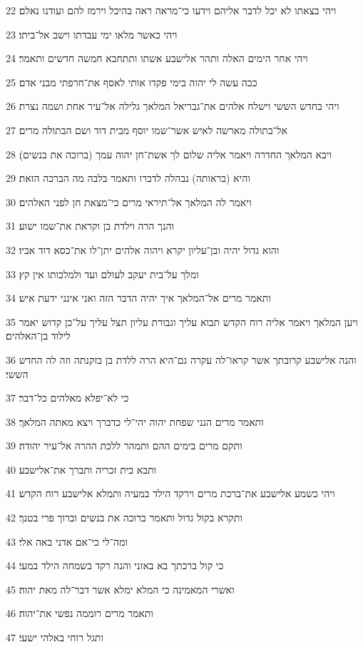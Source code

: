 \par 22 ויהי בצאתו לא יכל לדבר אליהם וידעו כי־מראה ראה בהיכל וירמז להם ועודנו נאלם׃
\par 23 ויהי כאשר מלאו ימי עבדתו וישב אל־ביתו׃
\par 24 ויהי אחר הימים האלה ותהר אלישבע אשתו ותתחבא חמשה חדשים ותאמר׃
\par 25 ככה עשה לי יהוה בימי פקדו אותי לאסף את־חרפתי מבני אדם׃
\par 26 ויהי בחדש הששי וישלח אלהים את־גבריאל המלאך גלילה אל־עיר אחת ושמה נצרת׃
\par 27 אל־בתולה מארשה לאיש אשר־שמו יוסף מבית דוד ושם הבתולה מרים׃
\par 28 ויבא המלאך החדרה ויאמר אליה שלום לך אשת־חן יהוה עמך (ברוכה את בנשים)׃
\par 29 והיא (בראותה) נבהלה לדברו ותאמר בלבה מה הברכה הזאת׃
\par 30 ויאמר לה המלאך אל־תיראי מרים כי־מצאת חן לפני האלהים׃
\par 31 והנך הרה וילדת בן וקראת את־שמו ישוע׃
\par 32 והוא גדול יהיה ובן־עליון יקרא ויהוה אלהים יתן־לו את־כסא דוד אביו׃
\par 33 ומלך על־בית יעקב לעולם ועד ולמלכותו אין קץ׃
\par 34 ותאמר מרים אל־המלאך איך יהיה הדבר הזה ואני אינני ידעת איש׃
\par 35 ויען המלאך ויאמר אליה רוח הקדש תבוא עליך וגבורת עליון תצל עליך על־כן קדוש יאמר לילוד בן־האלהים׃
\par 36 והנה אלישבע קרובתך אשר קראו־לה עקרה גם־היא הרה ללדת בן בזקנתה וזה לה החדש הששי׃
\par 37 כי לא־יפלא מאלהים כל־דבר׃
\par 38 ותאמר מרים הנני שפחת יהוה יהי־לי כדברך ויצא מאתה המלאך׃
\par 39 ותקם מרים בימים ההם ותמהר ללכת ההרה אל־עיר יהודה׃
\par 40 ותבא בית זכריה ותברך את־אלישבע׃
\par 41 ויהי כשמע אלישבע את־ברכת מרים וירקד הילד במעיה ותמלא אלישבע רוח הקדש׃
\par 42 ותקרא בקול גדול ותאמר ברוכה את בנשים וברוך פרי בטנך׃
\par 43 ומה־לי כי־אם אדני באה אלי׃
\par 44 כי קול ברכתך בא באזני והנה רקד בשמחה הילד במעי׃
\par 45 ואשרי המאמינה כי המלא ימלא אשר דבר־לה מאת יהוה׃
\par 46 ותאמר מרים רוממה נפשי את־יהוה׃
\par 47 ותגל רוחי באלהי ישעי׃
